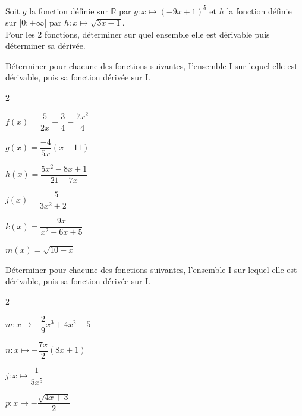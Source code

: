 \documentclass[11pt,a4paper]{article}  %
\begin{document}
\exercice{}

Soit $g$ la fonction définie sur $\mathbb{R}$ par $g: x \mapsto(-9 x+1)^5$ et $h$ la fonction définie sur $[0 ;+\infty[$ par $h: x \mapsto \sqrt{3 x-1}$.\\
Pour les 2 fonctions, déterminer sur quel ensemble elle est dérivable puis déterminer sa dérivée.

\exercice{}

Déterminer pour chacune des fonctions suivantes, I'ensemble I sur lequel elle est dérivable, puis sa fonction dérivée sur $\mathrm{I}$.
\begin{multicols}{2}
	\begin{enumMet}
		\item $f(x)=\dfrac{5}{2 x}+\dfrac{3}{4}-\dfrac{7 x^2}{4}$
		\item $g(x)=\dfrac{-4}{5 x}(x-11)$
		\item $h(x)=\dfrac{5 x^2-8 x+1}{21-7 x}$
		\item $j(x)=\dfrac{-5}{3 x^2+2}$
		\item $k(x)=\dfrac{9 x}{x^2-6 x+5}$
		\item $m(x)=\sqrt{10-x}$
	\end{enumMet}
\end{multicols}


\exercice{}

Déterminer pour chacune des fonctions suivantes, l'ensemble I sur lequel elle est dérivable, puis sa fonction dérivée sur I.
\begin{multicols}{2}
	\begin{enumMet}
		\item $m: x \mapsto-\dfrac{2}{9} x^3+4 x^2-5$
		\item $n: x \mapsto-\dfrac{7 x}{2}(8 x+1)$
		\item $j: x \mapsto \dfrac{1}{5 x^5}$
		\item $p: x \mapsto-\dfrac{\sqrt{4 x+3}}{2}$
	\end{enumMet}
\end{multicols}
\end{document}
